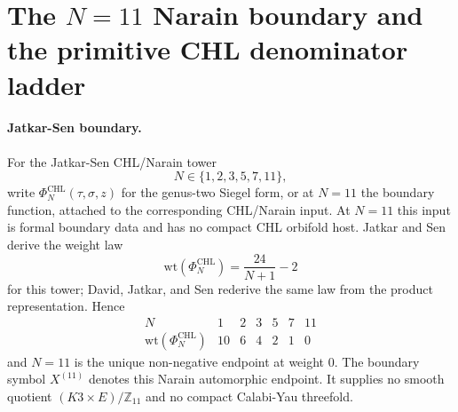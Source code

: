 
\providecommand{\kBKM}{\kappa_{\mathrm{BKM}}}
\providecommand{\kch}{\kappa_{\mathrm{ch}}}
\providecommand{\kcat}{\kappa_{\mathrm{cat}}}
\providecommand{\kfib}{\kappa_{\mathrm{fiber}}}
\providecommand{\PhiCHL}{\Phi^{\mathrm{CHL}}}
\providecommand{\Sp}{\mathrm{Sp}}
\providecommand{\Mwh}{M^{!}}

\section*{The \(N=11\) Narain boundary and the primitive CHL denominator ladder}

\paragraph{Jatkar-Sen boundary.}
For the Jatkar-Sen CHL/Narain tower
\[
  N\in\{1,2,3,5,7,11\},
\]
write \(\PhiCHL_N(\tau,\sigma,z)\) for the genus-two Siegel form, or
at \(N=11\) the boundary function, attached to the corresponding
CHL/Narain input. At \(N=11\) this input is formal boundary data and
has no compact CHL orbifold host. Jatkar and Sen derive the weight law
\[
  \mathrm{wt}(\PhiCHL_N)=\frac{24}{N+1}-2
\]
for this tower; David, Jatkar, and Sen rederive the same law from the
product representation. Hence
\[
\begin{array}{c|cccccc}
N&1&2&3&5&7&11\\ \hline
\mathrm{wt}(\PhiCHL_N)&10&6&4&2&1&0
\end{array}
\]
and \(N=11\) is the unique non-negative endpoint at weight \(0\).
The boundary symbol \(X^{(11)}\) denotes this Narain automorphic
endpoint. It supplies no smooth quotient
\((K3\times E)/\mathbb Z_{11}\) and no compact Calabi-Yau threefold.

